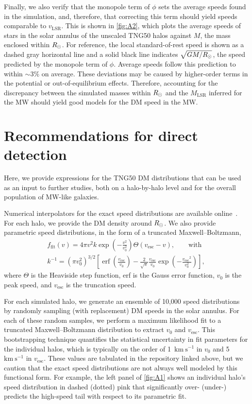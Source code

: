 \documentclass[aps,prl,reprint,superscriptaddress,nopreprintnumbers,nobibnotes,floatfix,longbibliography,footinbib]{revtex4-2}
\newcommand{\TNGfifty}{TNG50}
\newcommand{\vLSR}{\ensuremath{v_\mathrm{\scriptscriptstyle LSR}}}
\newcommand{\vesc}{\ensuremath{v_\mathrm{esc}}}
\newcommand{\MLSR}{\ensuremath{M_\mathrm{LSR}}}
\newcommand{\kms}{\ensuremath{\text{km}~\mathrm{s}^{-1}}}
\newcommand{\osim}{\mathord{\sim}}
\newcommand{\Rsun}{\ensuremath{R_{\kern-0.1ex\odot}}}
\begin{document}
Finally, we also verify that the monopole term of $\phi$ sets the average speeds found in the simulation, and, therefore, that correcting this term should yield speeds comparable to $\vLSR$. This is shown in \autoref{fig:A2}, which plots the average speeds of stars in the solar annulus of the unscaled \TNGfifty{} halos against $M$, the mass enclosed within $\Rsun$. For reference, the local standard-of-rest speed is shown as a dashed gray horizontal line and a solid black line indicates $\sqrt{GM/\Rsun}$, the speed predicted by the monopole term of $\phi$. Average speeds follow this prediction to within $\osim3\%$ on average. These deviations may be caused by higher-order terms in the potential or out-of-equilibrium effects. Therefore, accounting for the discrepancy between the simulated masses within $\Rsun$ and the $\MLSR$ inferred for the MW should yield good models for the DM speed in the MW. 

\section{Recommendations for direct detection}
\label{app:B}

\setcounter{equation}{0}
\setcounter{figure}{0}
\setcounter{table}{0}

Here, we provide expressions for the \TNGfifty{} DM distributions that can be used as an input to further studies, both on a halo-by-halo level and for the overall population of MW-like galaxies. 

Numerical interpolators for the exact speed distributions are available online~\cite{data_release}. For each halo, we provide the DM density around $\Rsun$. We also provide parametric speed distributions, in the form of a truncated Maxwell--Boltzmann,
\begin{gather}
 f_\mathrm{fit}(v) = 4\pi v^2 k\exp\left(-\frac{v^2}{v_0^2}\right) \Theta(\vesc{} - v),\qquad\text{with}\label{eq:B1}\\
 k^{-1} = (\pi v_0^2)^{3/2}\left[\operatorname{erf}\left(\frac{\vesc{}}{v_0}\right) - \frac{2}{\sqrt{\pi}} \frac{\vesc{}}{v_0}\exp\left(-\frac{\vesc{}^2}{v_0^2}\right)\right],\label{eq:b2}
\end{gather}
where $\Theta$ is the Heaviside step function, erf is the Gauss error function, $v_0$ is the peak speed, and $\vesc{}$ is the truncation speed.

For each simulated halo, we generate an ensemble of 10,000 speed distributions by randomly sampling (with replacement) DM speeds in the solar annulus. For each of these random samples, we perform a maximum likelihood fit to a truncated Maxwell--Boltzmann distribution to extract $v_0$ and $\vesc{}$. This bootstrapping technique quantifies the statistical uncertainty in fit parameters for the individual halos, which is typically on the order of 1~\kms{} in $v_0$ and 5~\kms{} in $\vesc{}$. These values are tabulated in the repository linked above, but we caution that the exact speed distributions are not always well modeled by this functional form. For example, the left panel of \autoref{fig:A1} shows an individual halo's speed distribution in dashed (dotted) pink that significantly over- (under-) predicts the high-speed tail with respect to its parametric fit.
\end{document}

